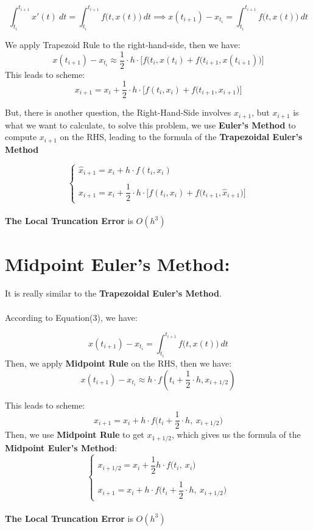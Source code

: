 \documentclass [9 pt]{article}
\theoremstyle{definition}
\begin{document}
\begin{equation}
	 \int_{t_i}^{t_{i+1}} x'(t)\ dt = \int_{t_i}^{t_{i+1}} f\Big(t, x(t)\Big)\ dt \implies x(t_{i+1}) - x_{t_i} = \int_{t_i}^{t_{i+1}} f\Big(t, x(t)\Big)\ dt
\end{equation}

We apply Trapezoid Rule to the right-hand-side, then we have:
$$ x(t_{i+1}) - x_{t_i} \approx \dfrac{1}{2} \cdot h \cdot \Bigg[ f(t_i, x(t_i) + f\Big(t_{i+1}, x( t_{i+1} )\Big) \Bigg] $$
This leads to scheme:
$$ x_{i+1} =  x_{i} + \dfrac{1}{2} \cdot h \cdot \Bigg[ f(t_i, x_i) + f\Big(t_{i+1}, x_{i+1} \Big) \Bigg] $$

\newpage
But, there is another question, the Right-Hand-Side involves $x_{i+1}$, but $x_{i+1}$ is what we want to calculate, to solve this problem, we use \textbf{Euler's Method} to compute $x_{i+1}$ on the RHS, leading to the formula of the \textbf{Trapezoidal Euler's Method}

$$
\begin{cases}
	\widehat{x}_{i+1} = x_i + h\cdot f(t_i, x_i) \\
	\\
	x_{i+1} =  x_{i} + \dfrac{1}{2} \cdot h \cdot \Bigg[ f(t_i, x_i) + f\Big(t_{i+1}, \widehat{x}_{i+1} \Big) \Bigg]
\end{cases}
$$ 
\\
\textbf{The Local Truncation Error} is $O(h^3)$

\section*{Midpoint Euler's Method:}
It is really similar to the \textbf{Trapezoidal Euler's Method}.\\
\\
According to Equation(3), we have:

\begin{equation}
	x(t_{i+1}) - x_{t_i} = \int_{t_i}^{t_{i+1}} f\Big(t, x(t)\Big)\ dt	
\end{equation}
Then, we apply \textbf{ Midpoint Rule } on the RHS, then we have:
$$ 
x(t_{i+1}) - x_{t_i} \approx  h\cdot f(t_i + \dfrac{1}{2}\cdot h, x_{i + 1/2})
$$

This leads to scheme:
$$ x_{i+1} =  x_{i} + h\cdot f\Big(t_i + \dfrac{1}{2}\cdot h,\ x_{i + 1/2}\Big) $$
Then, we use \textbf{Midpoint Rule} to get $x_{1 + 1/2}$, which gives us the formula of the \textbf{Midpoint Euler's Method}:
$$
\begin{cases}
	x_{i + 1/2 } = x_i + \dfrac{1}{2} h \cdot  f\Big(t_i ,\ x_{i }\Big) \\
	\\
	x_{i+1} =  x_{i} + h\cdot f\Big(t_i + \dfrac{1}{2}\cdot h,\ x_{i + 1/2}\Big)
\end{cases}
$$
\\
\textbf{The Local Truncation Error} is $O(h^3)$
\end{document}
